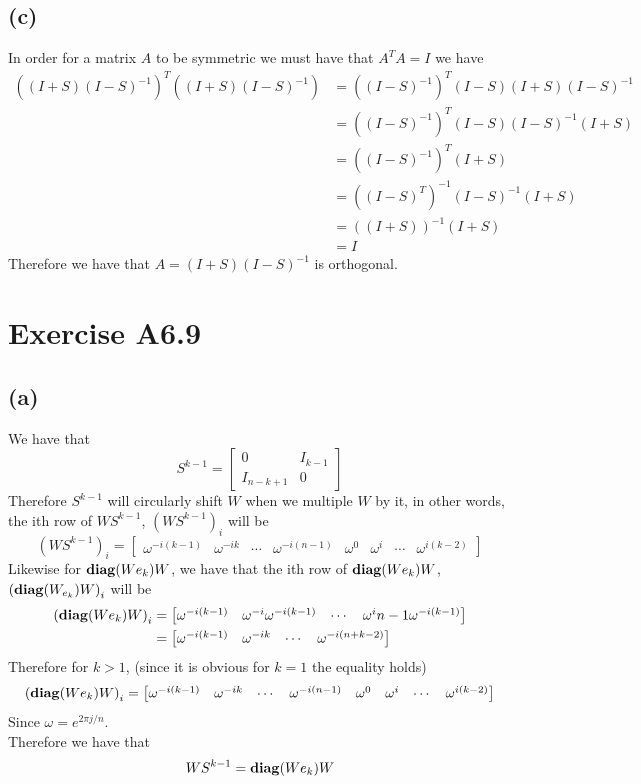 \subsection*{(c)}
In order for a matrix $A$ to be symmetric we must have that 
$A^TA=I$ we have 
\begin{align*}
    \left((I+S)(I-S)^{-1}\right)^T\left((I+S)(I-S)^{-1}\right)&=
        \left((I-S)^{-1}\right)^T(I-S)(I+S)(I-S)^{-1}\\
        &=\left((I-S)^{-1}\right)^T(I-S)(I-S)^{-1}(I+S)\\
        &=\left((I-S)^{-1}\right)^T(I+S)\\
        &=\left((I-S)^{T}\right)^{-1}(I-S)^{-1}(I+S)\\
        &=\left((I+S)\right)^{-1}(I+S)\\
        &=I
\end{align*}
Therefore we have that $A=(I+S)(I-S)^{-1}$ is orthogonal.

\section*{Exercise A6.9}
\subsection*{(a)}
We have that 
$$S^{k-1}=\begin{bmatrix}
    0 & I_{k-1}\\
    I_{n-k+1} & 0
\end{bmatrix}$$
Therefore $S^{k-1}$ will circularly shift $W$ when we multiple $W$ by 
it, in other words, the ith row of $WS^{k-1}$, $\left(WS^{k-1}\right)_{i}$ will be 
$$\left(WS^{k-1}\right)_{i}=\begin{bmatrix}
    \omega^{-i(k-1)} & \omega^{-ik} & \cdots & \omega^{-i(n-1)} & \omega^0 & \omega^i & \cdots & \omega^{i(k-2)}
\end{bmatrix}$$ 
Likewise for $\text{\textbf{diag}}(We_{k})W$, we have that 
the ith row of $\text{\textbf{diag}}(We_{k})W$, $\left(\text{\textbf{diag}}(W_{e_{k}})W\right)_{i}$ will be
\begin{align*}
\left(\text{\textbf{diag}}(We_{k})W\right)_{i} &= \begin{bmatrix}
    \omega^{-i(k-1)} & \omega^{-i}\omega^{-i(k-1)}  & \cdots & \omega^i{n-1}\omega^{-i(k-1)}
\end{bmatrix} \\
&= \begin{bmatrix}
    \omega^{-i(k-1)} & \omega^{-ik} & \cdots & \omega^{-i(n+k-2)}
\end{bmatrix}
\end{align*}
Therefore for $k>1$, (since it is obvious for $k=1$ the equality holds)
$$\left(\text{\textbf{diag}}(We_{k})W\right)_{i}=
\begin{bmatrix}
    \omega^{-i(k-1)} & \omega^{-ik} & \cdots & \omega^{-i(n-1)} & \omega^0 & \omega^i & \cdots & \omega^{i(k-2)}
\end{bmatrix}
$$
Since $\omega=e^{2\pi j/n}$.\\
Therefore we have that
$$WS^{k-1}=\text{\textbf{diag}}(We_{k})W$$
